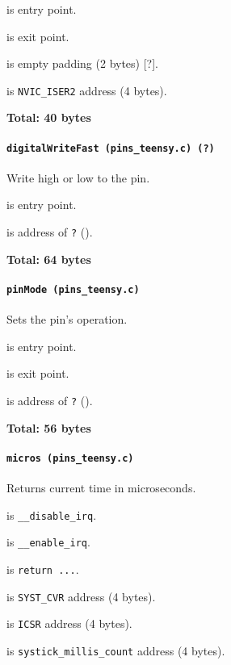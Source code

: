  is entry point.

 is exit point.

 is empty padding (2 bytes) [?].

 is \texttt{NVIC\_ISER2} address (4 bytes).

\textbf{Total: 40 bytes}

\paragraph{\texttt{digitalWriteFast (pins\_teensy.c) (?)}} Write high or low to the
pin.

 is entry point.

 is address of \texttt{?} ().

\textbf{Total: 64 bytes}

\paragraph{\texttt{pinMode (pins\_teensy.c)}} Sets the pin's operation.

 is entry point.

 is exit point.

 is address of \texttt{?} ().

\textbf{Total: 56 bytes}

\paragraph{\texttt{micros (pins\_teensy.c)}} Returns current time in
microseconds.

 is \texttt{\_\_disable\_irq}.

 is \texttt{\_\_enable\_irq}.

 is \texttt{return ...}.

\vspace{1em}

 is \texttt{SYST\_CVR} address (4 bytes).

 is \texttt{ICSR} address (4 bytes).

 is \texttt{systick\_millis\_count} address (4 bytes).

